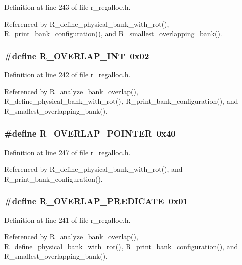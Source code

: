 Definition at line 243 of file r\_\-regalloc.h.

Referenced by R\_\-define\_\-physical\_\-bank\_\-with\_\-rot(), R\_\-print\_\-bank\_\-configuration(), and R\_\-smallest\_\-overlapping\_\-bank().
\subsubsection{\setlength{\rightskip}{0pt plus 5cm}\#define R\_\-OVERLAP\_\-INT~0x02}\label{r__regalloc_8h_50db5ca5a780b43f3544105deed28599}




Definition at line 242 of file r\_\-regalloc.h.

Referenced by R\_\-analyze\_\-bank\_\-overlap(), R\_\-define\_\-physical\_\-bank\_\-with\_\-rot(), R\_\-print\_\-bank\_\-configuration(), and R\_\-smallest\_\-overlapping\_\-bank().
\subsubsection{\setlength{\rightskip}{0pt plus 5cm}\#define R\_\-OVERLAP\_\-POINTER~0x40}\label{r__regalloc_8h_cd15c4c66329039f78debedd0dc8871b}




Definition at line 247 of file r\_\-regalloc.h.

Referenced by R\_\-define\_\-physical\_\-bank\_\-with\_\-rot(), and R\_\-print\_\-bank\_\-configuration().
\subsubsection{\setlength{\rightskip}{0pt plus 5cm}\#define R\_\-OVERLAP\_\-PREDICATE~0x01}\label{r__regalloc_8h_ac906f27db11740d7949f4954ceab84b}




Definition at line 241 of file r\_\-regalloc.h.

Referenced by R\_\-analyze\_\-bank\_\-overlap(), R\_\-define\_\-physical\_\-bank\_\-with\_\-rot(), R\_\-print\_\-bank\_\-configuration(), and R\_\-smallest\_\-overlapping\_\-bank().
